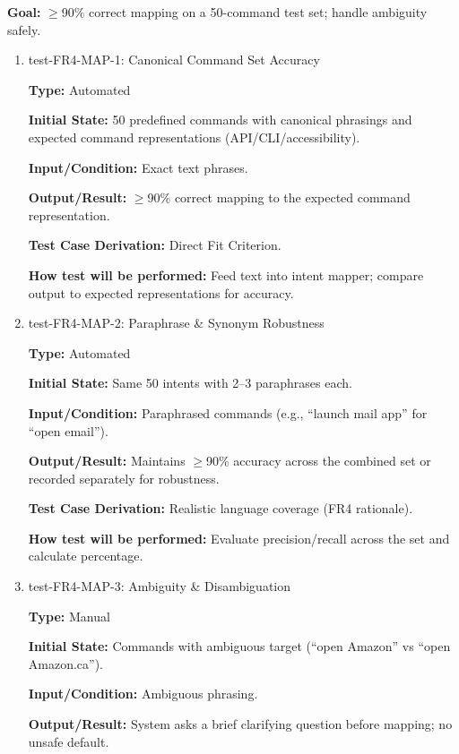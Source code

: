 \documentclass[12pt, titlepage]{article}
\begin{document}
\textbf{Goal:} $\geq$90\% correct mapping on a 50-command test set; handle ambiguity safely.



\begin{enumerate}

\item{test-FR4-MAP-1: Canonical Command Set Accuracy\\}

\textbf{Type:} Automated

\textbf{Initial State:} 50 predefined commands with canonical phrasings and expected command representations (API/CLI/accessibility).

\textbf{Input/Condition:} Exact text phrases.

\textbf{Output/Result:} $\geq$90\% correct mapping to the expected command representation.

\textbf{Test Case Derivation:} Direct Fit Criterion.

\textbf{How test will be performed:} Feed text into intent mapper; compare output to expected representations for accuracy.

\item{test-FR4-MAP-2: Paraphrase \& Synonym Robustness\\}

\textbf{Type:} Automated

\textbf{Initial State:} Same 50 intents with 2--3 paraphrases each.

\textbf{Input/Condition:} Paraphrased commands (e.g., “launch mail app” for “open email”).

\textbf{Output/Result:} Maintains $\geq$90\% accuracy across the combined set or recorded separately for robustness.

\textbf{Test Case Derivation:} Realistic language coverage (FR4 rationale).

\textbf{How test will be performed:} Evaluate precision/recall across the set and calculate percentage.

\item{test-FR4-MAP-3: Ambiguity \& Disambiguation\\}

\textbf{Type:} Manual

\textbf{Initial State:} Commands with ambiguous target (“open Amazon” vs “open Amazon.ca”).

\textbf{Input/Condition:} Ambiguous phrasing.

\textbf{Output/Result:} System asks a brief clarifying question before mapping; no unsafe default.


\end{enumerate}
\end{document}
